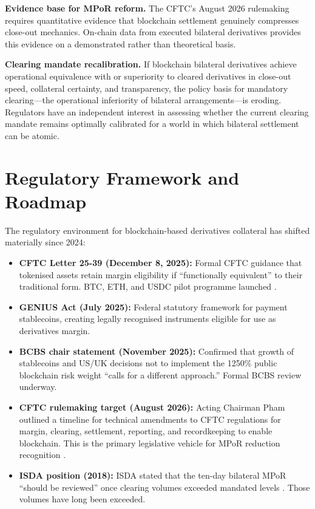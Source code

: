 \documentclass[12pt,letterpaper]{article}
\numberwithin{equation}{section}
\theoremstyle{remark}
\begin{document}
\textbf{Evidence base for MPoR reform.} The CFTC's August 2026 rulemaking
requires quantitative evidence that blockchain settlement genuinely compresses
close-out mechanics. On-chain data from executed bilateral derivatives
provides this evidence on a demonstrated rather than theoretical basis.

\textbf{Clearing mandate recalibration.} If blockchain bilateral derivatives
achieve operational equivalence with or superiority to cleared derivatives
in close-out speed, collateral certainty, and transparency, the policy
basis for mandatory clearing---the operational inferiority of bilateral
arrangements---is eroding. Regulators have an independent interest in
assessing whether the current clearing mandate remains optimally calibrated
for a world in which bilateral settlement can be atomic.

\section{Regulatory Framework and Roadmap}
\label{sec:regulatory}

The regulatory environment for blockchain-based derivatives collateral has
shifted materially since 2024:

\begin{itemize}[leftmargin=2em,itemsep=4pt]
  \item \textbf{CFTC Letter 25-39 (December 8, 2025):} Formal CFTC guidance
    that tokenised assets retain margin eligibility if ``functionally
    equivalent'' to their traditional form. BTC, ETH, and USDC pilot
    programme launched \citep{cftc_2025}.
  \item \textbf{GENIUS Act (July 2025):} Federal statutory framework for
    payment stablecoins, creating legally recognised instruments eligible for
    use as derivatives margin.
  \item \textbf{BCBS chair statement (November 2025):} Confirmed that growth
    of stablecoins and US/UK decisions not to implement the 1250\% public
    blockchain risk weight ``calls for a different approach.'' Formal BCBS
    review underway.
  \item \textbf{CFTC rulemaking target (August 2026):} Acting Chairman Pham
    outlined a timeline for technical amendments to CFTC regulations for
    margin, clearing, settlement, reporting, and recordkeeping to enable
    blockchain. This is the primary legislative vehicle for MPoR reduction
    recognition \citep{dwt_2025}.
  \item \textbf{ISDA position (2018):} ISDA stated that the ten-day bilateral
    MPoR ``should be reviewed'' once clearing volumes exceeded mandated
    levels \citep{isda_2018}. Those volumes have long been exceeded.
\end{itemize}
\end{document}
